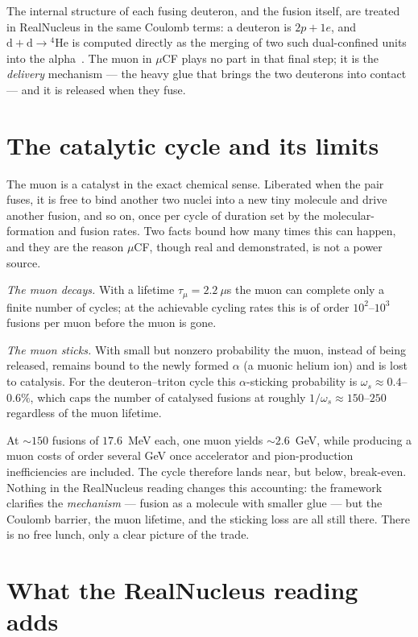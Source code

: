 \documentclass[11pt]{article}
\begin{document}
The internal structure of each fusing deuteron, and the fusion itself, are treated in RealNucleus in the
same Coulomb terms: a deuteron is $2p+1e$, and $\mathrm{d}+\mathrm{d}\to{}^4\mathrm{He}$ is computed
directly as the merging of two such dual-confined units into the alpha~\cite{Johnson-RealNucleus}. The
muon in $\mu$CF plays no part in that final step; it is the \emph{delivery} mechanism --- the heavy glue
that brings the two deuterons into contact --- and it is released when they fuse.

\section{The catalytic cycle and its limits}

The muon is a catalyst in the exact chemical sense. Liberated when the pair fuses, it is free to bind
another two nuclei into a new tiny molecule and drive another fusion, and so on, once per cycle of
duration set by the molecular-formation and fusion rates. Two facts bound how many times this can
happen, and they are the reason $\mu$CF, though real and demonstrated, is not a power source.

\emph{The muon decays.} With a lifetime $\tau_\mu=2.2~\mu$s the muon can complete only a finite number
of cycles; at the achievable cycling rates this is of order $10^2$--$10^3$ fusions per muon before the
muon is gone.

\emph{The muon sticks.} With small but nonzero probability the muon, instead of being released, remains
bound to the newly formed $\alpha$ (a muonic helium ion) and is lost to catalysis. For the
deuteron--triton cycle this $\alpha$-sticking probability is $\omega_s\approx0.4$--$0.6\%$, which caps
the number of catalysed fusions at roughly $1/\omega_s\approx150$--$250$ regardless of the muon
lifetime.

At $\sim\!150$ fusions of $17.6$~MeV each, one muon yields $\sim\!2.6$~GeV, while producing a muon costs
of order several GeV once accelerator and pion-production inefficiencies are included. The cycle
therefore lands near, but below, break-even. Nothing in the RealNucleus reading changes this
accounting: the framework clarifies the \emph{mechanism} --- fusion as a molecule with smaller glue ---
but the Coulomb barrier, the muon lifetime, and the sticking loss are all still there. There is no free
lunch, only a clear picture of the trade.

\section{What the RealNucleus reading adds}
\end{document}
